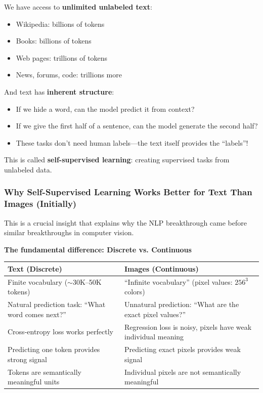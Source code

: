 \documentclass{article}
\begin{document}
\begin{tcolorbox}[colback=yellow!5!white, colframe=orange!50!black, title=Text Contains Its Own Supervision Signal]
We have access to \textbf{unlimited unlabeled text}:
\begin{itemize}
\item Wikipedia: billions of tokens
\item Books: billions of tokens
\item Web pages: trillions of tokens
\item News, forums, code: trillions more
\end{itemize}

And text has \textbf{inherent structure}:
\begin{itemize}
\item If we hide a word, can the model predict it from context?
\item If we give the first half of a sentence, can the model generate the second half?
\item These tasks don't need human labels---the text itself provides the ``labels''!
\end{itemize}

This is called \textbf{self-supervised learning}: creating supervised tasks from unlabeled data.
\end{tcolorbox}

\subsubsection{Why Self-Supervised Learning Works Better for Text Than Images (Initially)}

This is a crucial insight that explains why the NLP breakthrough came before similar breakthroughs in computer vision.

\textbf{The fundamental difference: Discrete vs. Continuous}

\begin{center}
\begin{tabular}{p{5cm}p{5cm}}
\toprule
\textbf{Text (Discrete)} & \textbf{Images (Continuous)} \\
\midrule
Finite vocabulary ($\sim$30K--50K tokens) & ``Infinite vocabulary'' (pixel values: $256^3$ colors) \\
\midrule
Natural prediction task: ``What word comes next?'' & Unnatural prediction: ``What are the exact pixel values?'' \\
\midrule
Cross-entropy loss works perfectly & Regression loss is noisy, pixels have weak individual meaning \\
\midrule
Predicting one token provides strong signal & Predicting exact pixels provides weak signal \\
\midrule
Tokens are semantically meaningful units & Individual pixels are not semantically meaningful \\
\bottomrule
\end{tabular}
\end{center}
\end{document}
